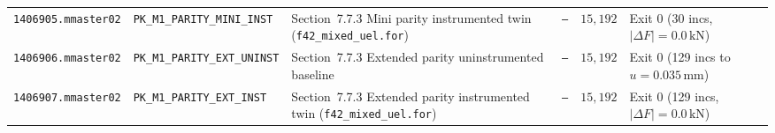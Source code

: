 \begin{table}[htbp]
\begin{tabularx}{\textwidth}{llXlrl}
\texttt{1406905.mmaster02} & \texttt{PK\_M1\_PARITY\_MINI\_INST} & Section~7.7.3 Mini parity instrumented twin (\nolinkurl{f42_mixed_uel.for}) & \texttt{---} & $15{,}192$ & Exit 0 (30 incs, $|\Delta F|=0.0\,\text{kN}$) \\
\texttt{1406906.mmaster02} & \texttt{PK\_M1\_PARITY\_EXT\_UNINST} & Section~7.7.3 Extended parity uninstrumented baseline & \texttt{---} & $15{,}192$ & Exit 0 (129 incs to $u=0.035\,\text{mm}$) \\
\texttt{1406907.mmaster02} & \texttt{PK\_M1\_PARITY\_EXT\_INST} & Section~7.7.3 Extended parity instrumented twin (\nolinkurl{f42_mixed_uel.for}) & \texttt{---} & $15{,}192$ & Exit 0 (129 incs, $|\Delta F|=0.0\,\text{kN}$) \\
\bottomrule
\end{tabularx}
\end{table}

